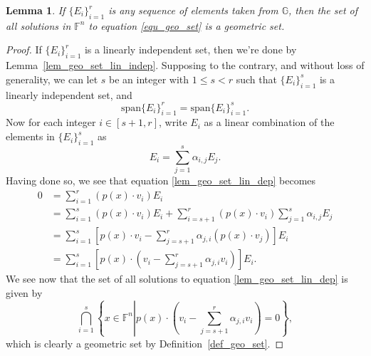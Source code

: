 \documentclass{birkjour}
\newtheorem{lem}[thm]{Lemma}
\theoremstyle{definition}
\theoremstyle{remark}
\numberwithin{equation}{section}
\newcommand{\F}{\mathbb{F}}
\newcommand{\G}{\mathbb{G}}
\begin{document}
\begin{lem}\label{lem_geo_set_lin_dep}
If $\{E_i\}_{i=1}^r$ is any sequence of elements taken from $\G$, then the set of all solutions in $\F^n$ to equation \eqref{equ_geo_set}
is a geometric set.
\end{lem}
\begin{proof}
If $\{E_i\}_{i=1}^r$ is a linearly independent set, then we're done by Lemma~\ref{lem_geo_set_lin_indep}.
Supposing to the contrary, and without loss of generality, we can let $s$ be an integer with $1\leq s<r$ such that
$\{E_i\}_{i=1}^s$ is a linearly independent set, and
\begin{equation*}
\mbox{span}\{E_i\}_{i=1}^r = \mbox{span}\{E_i\}_{i=1}^s.
\end{equation*}
Now for each integer $i\in[s+1,r]$, write $E_i$ as a linear combination of the elements in $\{E_i\}_{i=1}^s$ as
\begin{equation*}
E_i = \sum_{j=1}^s\alpha_{i,j} E_j.
\end{equation*}
Having done so, we see that equation \eqref{lem_geo_set_lin_dep} becomes
\begin{align*}
0 &= \sum_{i=1}^r(p(x)\cdot v_i)E_i \\
 &= \sum_{i=1}^s(p(x)\cdot v_i)E_i + \sum_{i=s+1}^r(p(x)\cdot v_i)\sum_{j=1}^s\alpha_{i,j}E_j \\
 &= \sum_{i=1}^s\left[p(x)\cdot v_i-\sum_{j=s+1}^r\alpha_{j,i}(p(x)\cdot v_j)\right]E_i \\
 &= \sum_{i=1}^s\left[p(x)\cdot\left(v_i-\sum_{j=s+1}^r\alpha_{j,i}v_i\right)\right]E_i.
\end{align*}
We see now that the set of all solutions to equation \eqref{lem_geo_set_lin_dep} is given by
\begin{equation*}
\bigcap_{i=1}^s\left\{x\in\F^n\left|p(x)\cdot\left(v_i-\sum_{j=s+1}^r\alpha_{j,i}v_i\right)=0\right.\right\},
\end{equation*}
which is clearly a geometric set by Definition~\ref{def_geo_set}.
\end{proof}
\end{document}
